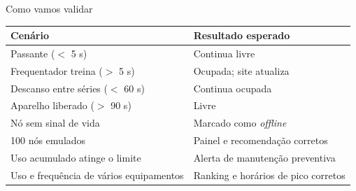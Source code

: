 \documentclass[aspectratio=169,11pt]{beamer}
\begin{document}
\begin{frame}[t]{Como vamos validar}
  \renewcommand{\arraystretch}{1.2}
  \footnotesize
  \begin{tabular}{@{}p{6.3cm}p{6.3cm}@{}}
    \toprule
    \textbf{Cenário} & \textbf{Resultado esperado} \\
    \midrule
    Passante ($<$ 5 s) & Continua livre \\
    Frequentador treina ($>$ 5 s) & Ocupada; site atualiza \\
    Descanso entre séries ($<$ 60 s) & Continua ocupada \\
    Aparelho liberado ($>$ 90 s) & Livre \\
    Nó sem sinal de vida & Marcado como \emph{offline} \\
    100 nós emulados & Painel e recomendação corretos \\
    Uso acumulado atinge o limite & Alerta de manutenção preventiva \\
    Uso e frequência de vários equipamentos & Ranking e horários de pico corretos \\
    \bottomrule
  \end{tabular}
\end{frame}
\end{document}
